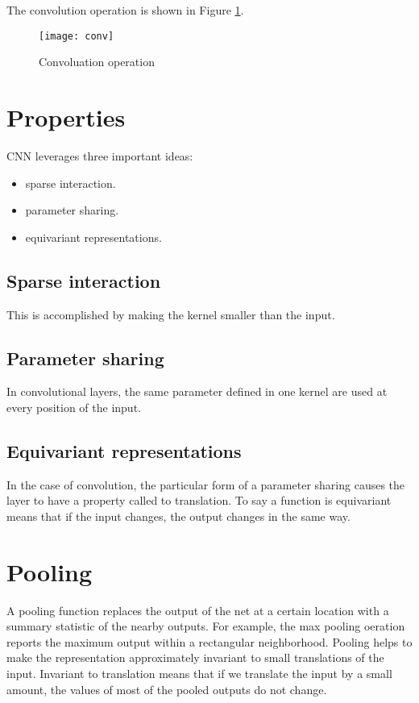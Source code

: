 The convolution operation is shown in Figure \ref{fig:conv-op}.
\begin{figure}[!htbp]
  \centering
  \texttt{[image: conv]}
  \caption{Convoluation operation}
  \label{fig:conv-op}
\end{figure}
\section{Properties}

CNN leverages three important ideas:
\begin{itemize}
\item sparse interaction.
\item parameter sharing.
\item equivariant representations.
\end{itemize}

\subsection{Sparse interaction}

This is accomplished by making the kernel smaller than the input.


\subsection{Parameter sharing}

In convolutional layers, the same parameter defined in one kernel are used at every position of the input.


\subsection{Equivariant representations}

In the case of convolution, the particular form of a parameter sharing causes the layer to have a property called  to translation.
To say a function is equivariant means that if the input changes, the output changes in the same way.




\section{ Pooling}


A pooling function replaces the output of the net at a certain location with a summary statistic of the nearby outputs.
For example, the max pooling oeration reports the maximum output within a rectangular neighborhood.
Pooling helps to make the representation approximately invariant to small translations of the input.
Invariant to translation means that if we translate the input by a small amount, the values of most of the pooled outputs do not change.

